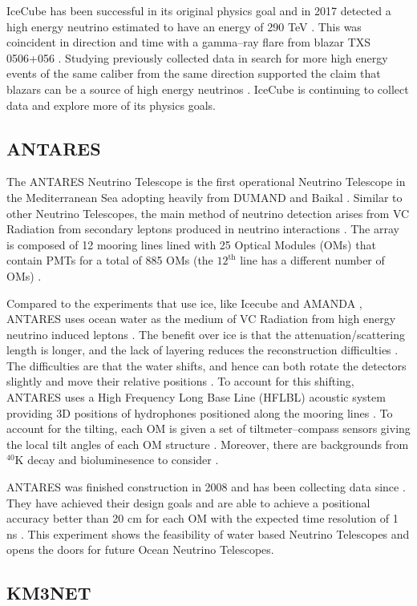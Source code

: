 IceCube has been successful in its original physics goal \cite{icecube} and in 2017 detected a high energy neutrino estimated to have an energy of 290 TeV \cite{icecube_nat}. This was coincident in direction and time with a gamma--ray flare from blazar TXS 0506+056 \cite{icecube_nat}. Studying previously collected data in search for more high energy events of the same caliber from the same direction supported the claim that blazars can be a source of high energy neutrinos \cite{icecube_nat}. IceCube is continuing to collect data and explore more of its physics goals.

\subsection{ANTARES}

The ANTARES Neutrino Telescope is the first operational Neutrino Telescope in the Mediterranean Sea \cite{antares} adopting heavily from DUMAND \cite{dumand} and Baikal \cite{baikal}. Similar to other Neutrino Telescopes, the main method of neutrino detection arises from VC Radiation from secondary leptons produced in neutrino interactions \cite{antares}. The array is composed of 12 mooring lines lined with 25 Optical Modules (OMs) that contain PMTs for a total of 885 OMs (the $12^{\text{th}}$ line has a different number of OMs) \cite{antares}.

Compared to the experiments that use ice, like Icecube \cite{icecube, icecube_nat, icecube_rad} and AMANDA \cite{amanda}, ANTARES uses ocean water as the medium of VC Radiation from high energy neutrino induced leptons \cite{antares}. The benefit over ice is that the attenuation/scattering length is longer, and the lack of layering reduces the reconstruction difficulties \cite{antares, icecube_rad}. The difficulties are that the water shifts, and hence can both rotate the detectors slightly and move their relative positions \cite{antares, icecube_rad}. To account for this shifting, ANTARES uses a High Frequency Long Base Line (HFLBL) acoustic system providing 3D positions of hydrophones positioned along the mooring lines \cite{antares}. To account for the tilting, each OM is given a set of tiltmeter--compass sensors giving the local tilt angles of each OM structure \cite{antares}. Moreover, there are backgrounds from $^{40}$K decay and bioluminesence to consider \cite{icecube_rad}.

ANTARES was finished construction in 2008 and has been collecting data since \cite{antares}. They have achieved their design goals and are able to achieve a positional accuracy better than 20 cm for each OM with the expected time resolution of 1 ns \cite{antares}. This experiment shows the feasibility of water based Neutrino Telescopes and opens the doors for future Ocean Neutrino Telescopes. 

\subsection{KM3NET}
